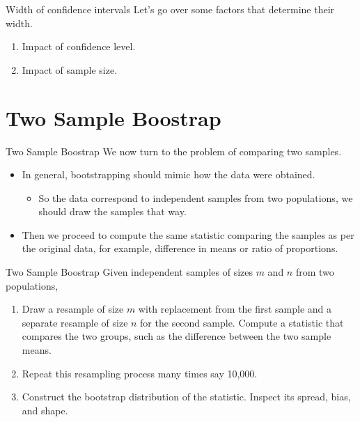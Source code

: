 \documentclass[
  ignorenonframetext,
]{beamer}
\providecommand{\tightlist}{%
  \setlength{\itemsep}{0pt}\setlength{\parskip}{0pt}}
\begin{document}
\begin{frame}{Width of confidence intervals}
\protect\hypertarget{width-of-confidence-intervals}{}
Let's go over some factors that determine their width.

\begin{enumerate}
\item
  Impact of confidence level.
\item
  Impact of sample size.
\end{enumerate}
\end{frame}

\hypertarget{two-sample-boostrap}{%
\section{Two Sample Boostrap}\label{two-sample-boostrap}}

\begin{frame}{Two Sample Boostrap}
\protect\hypertarget{two-sample-boostrap-1}{}
We now turn to the problem of comparing two samples.

\begin{itemize}
\item
  In general, bootstrapping should mimic how the data were obtained.

  \begin{itemize}
  \tightlist
  \item
    So the data correspond to independent samples from two populations,
    we should draw the samples that way.
  \end{itemize}
\item
  Then we proceed to compute the same statistic comparing the samples as
  per the original data, for example, difference in means or ratio of
  proportions.
\end{itemize}
\end{frame}

\begin{frame}{Two Sample Boostrap}
\protect\hypertarget{two-sample-boostrap-2}{}
Given independent samples of sizes \(m\) and \(n\) from two populations,

\begin{enumerate}
\item
  Draw a resample of size \(m\) with replacement from the first sample
  and a separate resample of size \(n\) for the second sample. Compute a
  statistic that compares the two groups, such as the difference between
  the two sample means.
\item
  Repeat this resampling process many times say 10,000.
\item
  Construct the bootstrap distribution of the statistic. Inspect its
  spread, bias, and shape.
\end{enumerate}
\end{frame}
\end{document}
